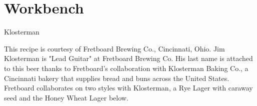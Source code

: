 \documentclass[10pt,oneside]{scrbook}
\begin{document}
\mainmatter
\twocolumn

\part{Workbench}

\begin{recipie}{Klosterman}

\begin{aboutblock}
This recipe is courtesy of Fretboard Brewing Co., Cincinnati, Ohio. 
Jim Klosterman is "Lead Guitar" at Fretboard Brewing Co. His last name is attached
to this beer thanks to Fretboard's collaboration with Klosterman Baking Co., a
Cincinnati bakery that supplies bread and buns across the United States. Fretboard
collaborates on two styles with Klosterman, a Rye Lager with caraway seed and the
Honey Wheat Lager below.
\end{aboutblock}


\begin{methodandtiming}
 
\begin{mashsteps}
\end{mashsteps}

\begin{fermentationsteps}
\end{fermentationsteps}

\end{methodandtiming}

\pagebreak

\begin{ingredientsblock}

\begin{malts}
\end{malts}

\begin{hops}
\end{hops}

\begin{yeasts}
\end{yeasts}

\end{ingredientsblock}

\end{recipie}

\backmatter


\end{document}
